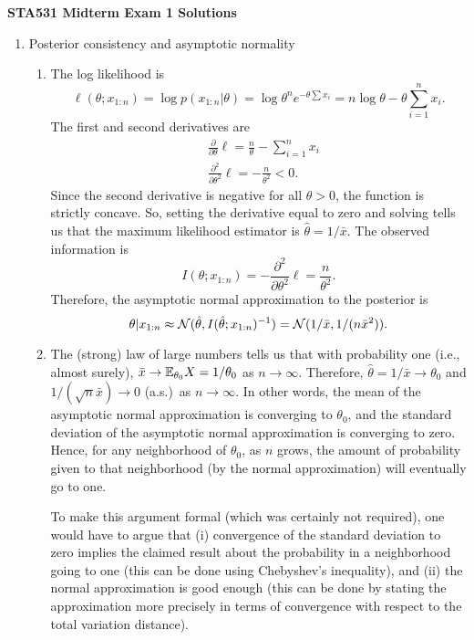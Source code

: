 \documentclass[12pt]{article}
\begin{document}
\begin{center}
\large\textbf{STA531 Midterm Exam 1 Solutions}
\end{center}

\begin{enumerate}
\item  Posterior consistency and asymptotic normality
\begin{enumerate}
\item The log likelihood is
$$ \ell(\theta; x_{1:n}) = \log p(x_{1:n} | \theta) = \log \theta^n e^{- \theta \sum x_i} = n \log \theta - \theta \sum_{i = 1}^n x_i. $$
The first and second derivatives are
\begin{align*}
& \frac{\partial}{\partial \theta} \ell = \frac{n}{\theta} - \sum_{i = 1}^n x_i\\
& \frac{\partial^2}{\partial \theta^2} \ell = - \frac{n}{\theta^2} <0. 
\end{align*}
Since the second derivative is negative for all $\theta >0$, the function is strictly concave.
So, setting the derivative equal to zero and solving tells us that the maximum likelihood estimator is $\hat \theta = 1/\bar x$.
The observed information is
$$ I(\theta; x_{1:n}) = - \frac{\partial^2}{\partial \theta^2} \ell = \frac{n}{\theta^2}. $$
Therefore, the asymptotic normal approximation to the posterior is
$$ \theta | x_{1:n} \approx \mathcal{N}(\hat\theta,I(\hat\theta; x_{1:n})^{-1}) = \mathcal{N}(1/\bar x,1/(n \bar x^2)). $$


\item The (strong) law of large numbers tells us that with probability one (i.e., almost surely), $\bar x \to \mathbb{E}_{\theta_0} X = 1/\theta_0$ as $n \to \infty$. Therefore, $\hat\theta = 1/\bar x \to \theta_0$ and $1/(\sqrt n \bar x) \to 0$ (a.s.)\ as $n \to \infty$.
In other words, the mean of the asymptotic normal approximation is converging to $\theta_0$, and the standard deviation of the asymptotic normal approximation is converging to zero. Hence, for any neighborhood of $\theta_0$, as $n$ grows, the amount of probability given to that neighborhood (by the normal approximation) will eventually go to one. 

To make this argument formal (which was certainly not required), one would have to argue that (i) convergence of the standard deviation to zero implies the claimed result about the probability in a neighborhood going to one (this can be done using Chebyshev's inequality), and (ii) the normal approximation is good enough (this can be done by stating the approximation more precisely in terms of convergence with respect to the total variation distance).
\end{enumerate}



\end{enumerate}
\end{document}
